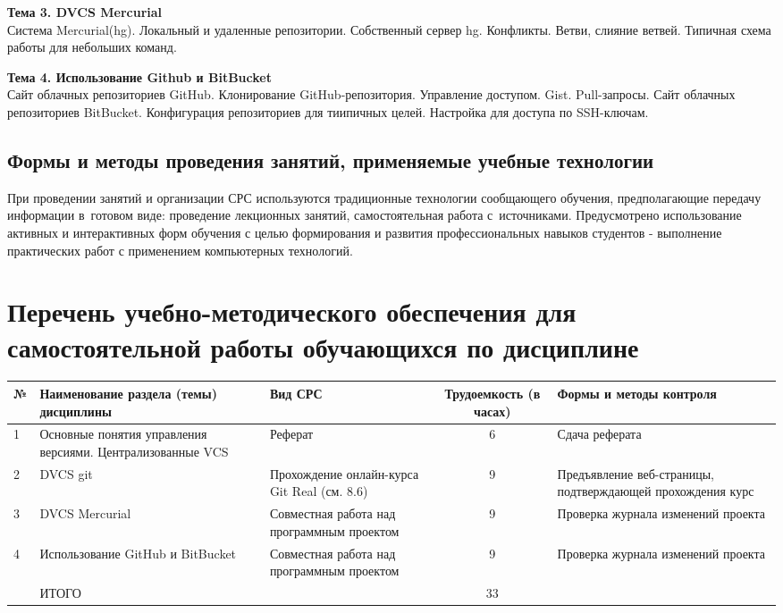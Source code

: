 \documentclass[a4paper,12pt]{article}
\begin{document}
\textbf{Тема 3. DVCS Mercurial }\\
Система Mercurial(hg). Локальный и удаленные репозитории. Собственный сервер hg. Конфликты. Ветви, слияние ветвей. Типичная схема работы для небольших команд.

\textbf{Тема 4. Использование Github и BitBucket}\\
Сайт облачных репозиториев GitHub. Клонирование GitHub-репозитория. Управление доступом. Gist. Pull-запросы. Сайт облачных репозиториев BitBucket. Конфигурация репозиториев для тиипичных целей. Настройка для доступа по SSH-ключам.
 

\subsection{Формы и методы проведения занятий, применяемые учебные технологии}
При проведении занятий и организации СРС используются традиционные технологии сообщающего обучения, предполагающие передачу информации в~готовом виде: проведение лекционных занятий, самостоятельная работа с~источниками. Предусмотрено использование активных и интерактивных форм обучения с целью формирования и развития профессиональных навыков студентов - выполнение практических работ с применением компьютерных технологий. 



\section{Перечень учебно-методического обеспечения для самостоятельной работы обучающихся по дисциплине}
\begin{longtable}{|l|>{\raggedright\arraybackslash}p{40mm}|>{\raggedright\arraybackslash}p{54mm}|c|>{\raggedright\arraybackslash}p{30mm}|}
\hline
№ & \centering Наименование раздела (темы) дисциплины & 
\centering Вид СРС & \multicolumn{1}{p{14mm}|}{\centering Трудо\-емкость (в часах)} & \centering\arraybackslash Формы и методы контроля\\
\hline
1 & Основные понятия управления версиями. Централизованные VCS & Реферат & 6 & Сдача реферата \\ 
\hline
2 & DVCS git                                                   & Прохождение онлайн-курса Git Real (см. 8.6) &  9 & Предъявление веб-страницы, подтверждающей прохождения курс \\ 
\hline
3 & DVCS Mercurial                                             & Совместная работа над программным проектом &  9 & Проверка журнала изменений проекта \\ 
\hline
4 & Использование GitHub и BitBucket                           & Совместная работа над программным проектом &  9 & Проверка журнала изменений проекта \\ 
\hline
 & ИТОГО                                                      &                     & 33 &  \\ 

\hline
\end{longtable}
\end{document}
